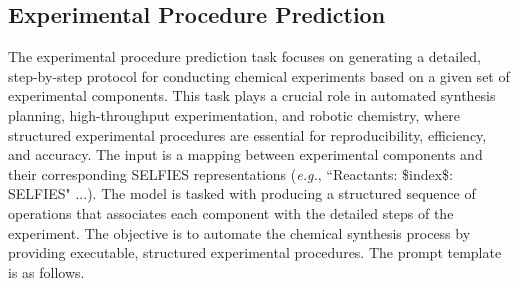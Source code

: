 \subsection{Experimental Procedure Prediction}
The experimental procedure prediction task focuses on generating a detailed, step-by-step protocol for conducting chemical experiments based on a given set of experimental components. This task plays a crucial role in automated synthesis planning, high-throughput experimentation, and robotic chemistry, where structured experimental procedures are essential for reproducibility, efficiency, and accuracy. The input is a mapping between experimental components and their corresponding SELFIES representations (\emph{e.g.}, ``Reactants: \$index\$: SELFIES" ...). The model is tasked with producing a structured sequence of operations that associates each component with the detailed steps of the experiment. The objective is to automate the chemical synthesis process by providing executable, structured experimental procedures. The prompt template is as follows.

